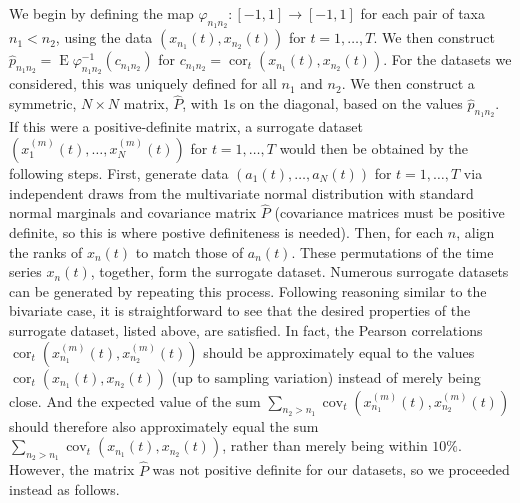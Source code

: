 \documentclass[letterpaper,11pt]{article}
\newcommand{\E}{\operatorname{E}}
\newcommand{\cor}{\operatorname{cor}}
\newcommand{\cov}{\operatorname{cov}}
\begin{document}
We begin by defining the map $\varphi_{n_1 n_2}:[-1,1]\rightarrow[-1,1]$
for each pair of taxa $n_1<n_2$, using the data $(x_{n_1}(t),x_{n_2}(t))$ for $t=1,\ldots,T$.
We then construct $\hat{p}_{n_1 n_2} = \E\varphi_{n_1 n_2}^{-1}(c_{n_1 n_2})$ for 
$c_{n_1 n_2} = \cor_t(x_{n_1}(t),x_{n_2}(t))$.
For the datasets we considered, this was uniquely defined for all $n_1$ and $n_2$.
We then construct a symmetric, $N \times N$ matrix, $\hat{P}$, with $1$s on the diagonal, based on the 
values $\hat{p}_{n_1 n_2}$. If this were a positive-definite matrix, a surrogate 
dataset $(x_1^{(m)}(t),\ldots,x_N^{(m)}(t))$ for $t=1,\ldots,T$ would 
then be obtained by the following steps. First, generate data 
$(a_1(t),\ldots,a_N(t))$ for $t=1,\ldots,T$ via independent draws from the multivariate normal
distribution with standard normal marginals and covariance matrix $\hat{P}$
(covariance matrices must be positive definite, so this is where postive definiteness is needed).
Then, for each $n$, align the ranks of $x_n(t)$ to match those of $a_n(t)$.
These permutations of the time series $x_n(t)$, together, form the surrogate dataset.
Numerous surrogate datasets can be generated by repeating this process.
Following reasoning similar to the bivariate case, it is straightforward
to see that the desired properties of the surrogate dataset, listed above, are
satisfied. In fact, the Pearson correlations 
$\cor_t(x_{n_1}^{(m)}(t),x_{n_2}^{(m)}(t))$ should be approximately equal
to the values $\cor_t(x_{n_1}(t),x_{n_2}(t))$ (up to sampling variation) 
instead of merely being close. And  
the expected value of the sum $\sum_{n_2>n_1} \cov_t(x_{n_1}^{(m)}(t),x_{n_2}^{(m)}(t))$
should therefore also approximately equal the sum $\sum_{n_2>n_1} \cov_t(x_{n_1}(t),x_{n_2}(t))$,
rather than merely being within $10\%$. However, the matrix $\hat{P}$ was not 
positive definite for our datasets, 
so we proceeded instead as follows. 
\end{document}
